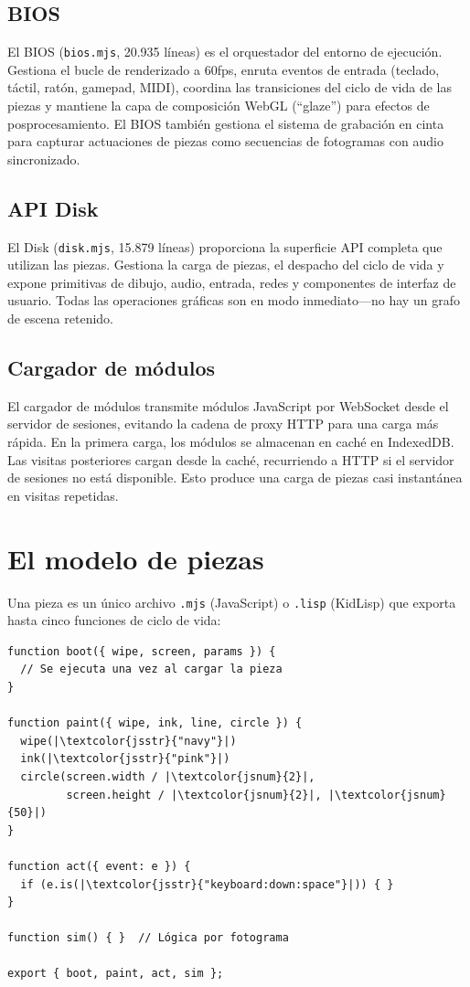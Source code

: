 \documentclass[10pt,letterpaper,twocolumn]{article}
\begin{document}
\subsection{BIOS}

El BIOS (\texttt{bios.mjs}, 20.935 líneas) es el orquestador del entorno de ejecución. Gestiona el bucle de renderizado a 60fps, enruta eventos de entrada (teclado, táctil, ratón, gamepad, MIDI), coordina las transiciones del ciclo de vida de las piezas y mantiene la capa de composición WebGL (``glaze'') para efectos de posprocesamiento. El BIOS también gestiona el sistema de grabación en cinta para capturar actuaciones de piezas como secuencias de fotogramas con audio sincronizado.

\subsection{API Disk}

El Disk (\texttt{disk.mjs}, 15.879 líneas) proporciona la superficie API completa que utilizan las piezas. Gestiona la carga de piezas, el despacho del ciclo de vida y expone primitivas de dibujo, audio, entrada, redes y componentes de interfaz de usuario. Todas las operaciones gráficas son en modo inmediato---no hay un grafo de escena retenido.

\subsection{Cargador de módulos}

El cargador de módulos transmite módulos JavaScript por WebSocket desde el servidor de sesiones, evitando la cadena de proxy HTTP para una carga más rápida. En la primera carga, los módulos se almacenan en caché en IndexedDB. Las visitas posteriores cargan desde la caché, recurriendo a HTTP si el servidor de sesiones no está disponible. Esto produce una carga de piezas casi instantánea en visitas repetidas.


\section{El modelo de piezas}
\label{sec:pieces}

Una pieza es un único archivo \texttt{.mjs} (JavaScript) o \texttt{.lisp} (KidLisp) que exporta hasta cinco funciones de ciclo de vida:

\begin{lstlisting}[style=acjsstyle]
function boot({ wipe, screen, params }) {
  // Se ejecuta una vez al cargar la pieza
}

function paint({ wipe, ink, line, circle }) {
  wipe(|\textcolor{jsstr}{"navy"}|)
  ink(|\textcolor{jsstr}{"pink"}|)
  circle(screen.width / |\textcolor{jsnum}{2}|,
         screen.height / |\textcolor{jsnum}{2}|, |\textcolor{jsnum}{50}|)
}

function act({ event: e }) {
  if (e.is(|\textcolor{jsstr}{"keyboard:down:space"}|)) { }
}

function sim() { }  // Lógica por fotograma

export { boot, paint, act, sim };
\end{lstlisting}
\end{document}
